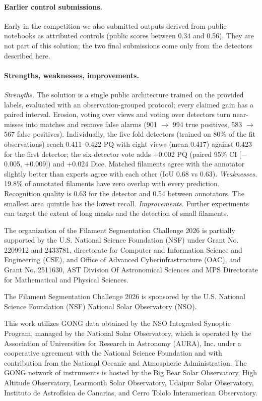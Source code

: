\documentclass[sigconf]{acmart}
\begin{document}
\paragraph{Earlier control submissions.} Early in the competition we also submitted outputs derived from public notebooks as attributed controls (public scores between 0.34 and 0.56). They are not part of this solution; the two final submissions come only from the detectors described here.

\paragraph{Strengths, weaknesses, improvements.}
\emph{Strengths.} The solution is a single public architecture trained on the provided labels, evaluated with an observation-grouped protocol; every claimed gain has a paired interval. Erosion, voting over views and voting over detectors turn near-misses into matches and remove false alarms (901 $\to$ 994 true positives, 583 $\to$ 567 false positives). Individually, the five fold detectors (trained on 80\% of the fit observations) reach 0.411--0.422 PQ with eight views (mean 0.417) against 0.423 for the first detector; the six-detector vote adds +0.002 PQ (paired 95\% CI [$-$0.005, +0.009]) and +0.024 Dice. Matched filaments agree with the annotator slightly better than experts agree with each other (IoU 0.68 vs 0.63). \emph{Weaknesses.} 19.8\% of annotated filaments have zero overlap with every prediction. Recognition quality is 0.63 for the detector and 0.54 between annotators. The smallest area quintile has the lowest recall. \emph{Improvements.} Further experiments can target the extent of long masks and the detection of small filaments.

\begin{acks}
The organization of the Filament Segmentation Challenge 2026 is partially supported by the U.S. National Science Foundation (NSF) under Grant No. 2209912 and 2433781, directorate for Computer and Information Science and Engineering (CSE), and Office of Advanced Cyberinfrastructure (OAC), and Grant No. 2511630, AST Division Of Astronomical Sciences and MPS Directorate for Mathematical and Physical Sciences.

The Filament Segmentation Challenge 2026 is sponsored by the U.S. National Science Foundation (NSF) National Solar Observatory (NSO).

This work utilizes GONG data obtained by the NSO Integrated Synoptic Program, managed by the National Solar Observatory, which is operated by the Association of Universities for Research in Astronomy (AURA), Inc. under a cooperative agreement with the National Science Foundation and with contribution from the National Oceanic and Atmospheric Administration. The GONG network of instruments is hosted by the Big Bear Solar Observatory, High Altitude Observatory, Learmonth Solar Observatory, Udaipur Solar Observatory, Instituto de Astrof\'isica de Canarias, and Cerro Tololo Interamerican Observatory.
\end{acks}



\end{document}
